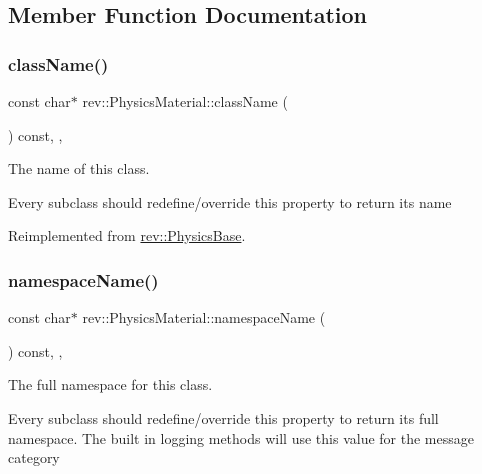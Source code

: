 \subsection{Member Function Documentation}
\mbox{\label{classrev_1_1_physics_material_ad5c1131d40a32771183345da25d1a38c}} 
\subsubsection{\texorpdfstring{className()}{className()}}
{\footnotesize\ttfamily const char$\ast$ rev\+::\+Physics\+Material\+::class\+Name (\begin{DoxyParamCaption}{ }\end{DoxyParamCaption}) const\hspace{0.3cm}{\ttfamily [inline]}, {\ttfamily [override]}, {\ttfamily [virtual]}}



The name of this class. 

Every subclass should redefine/override this property to return its name 

Reimplemented from \mbox{\hyperlink{classrev_1_1_physics_base_ad997bc1504ff6dccccbc3d8d0ea6e6a5}{rev\+::\+Physics\+Base}}.

\mbox{\label{classrev_1_1_physics_material_a6f593676796ebfff0aec28984f7b34b0}} 
\subsubsection{\texorpdfstring{namespaceName()}{namespaceName()}}
{\footnotesize\ttfamily const char$\ast$ rev\+::\+Physics\+Material\+::namespace\+Name (\begin{DoxyParamCaption}{ }\end{DoxyParamCaption}) const\hspace{0.3cm}{\ttfamily [inline]}, {\ttfamily [override]}, {\ttfamily [virtual]}}



The full namespace for this class. 

Every subclass should redefine/override this property to return its full namespace. The built in logging methods will use this value for the message category 

